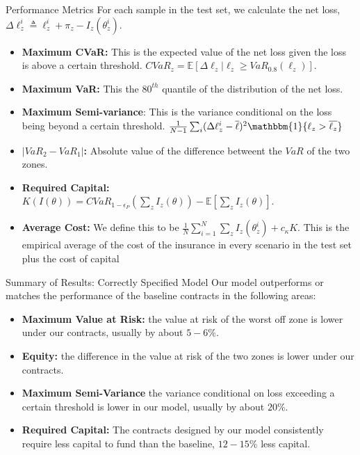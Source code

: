 \documentclass{beamer}
\begin{document}
\begin{frame}{Performance Metrics}
    For each sample in the test set, we calculate the net loss, $\Delta \ell_z^i \triangleq  \ell^i_z + \pi_z - I_z(\theta^i_z)$. 
    \begin{itemize}
        \item \textbf{Maximum CVaR:} This is the expected value of the net loss given the loss is above a certain threshold. $CVaR_z = \mathbb{E}\left [ \Delta \ell_z | \ell_z \geq VaR_{0.8} (\ell_z) \right ]$.
        \item \textbf{Maximum VaR:} This the $80^{th}$ quantile of the distribution of the net loss. 
        \item \textbf{Maximum Semi-variance}: This is the variance conditional on the loss being beyond a certain threshold. $\frac{1}{N-1}\sum_i (\Delta \ell_z^i - \overline{\ell})^2 \mathbbm{1} \{\ell_z > \overline{\ell_z}\}$ 
        \item \textbf{$|VaR_2 - VaR_1|$:} Absolute value of the difference betweent the $VaR$ of the two zones. 
        \item \textbf{Required Capital:} $K(I(\theta)) = CVaR_{1-\epsilon_P}(\sum_z I_z(\theta)) - \mathbb{E}[\sum_z I_z(\theta)]$. 
        \item \textbf{Average Cost:} We define this to be $\frac{1}{N}\sum_{i=1}^N \sum_z I_z(\theta^i_z) + c_{\kappa} K$. This is the empirical average of the cost of the insurance in every scenario in the test set plus the cost of capital
    \end{itemize}
\end{frame}

\begin{frame}{Summary of Results: Correctly Specified Model}
Our model outperforms or matches the performance of the baseline contracts in the following areas: 
\begin{itemize}
    \item \textbf{Maximum Value at Risk:} the value at risk of the worst off zone is lower under our contracts, usually by about $5-6\%$.
    \item \textbf{Equity:} the difference in the value at risk of the two zones is lower under our contracts.  
    
    \item \textbf{Maximum Semi-Variance} the variance conditional on loss exceeding a certain threshold is lower in our model, usually by about $20\%$.
    
    \item \textbf{Required Capital:} The contracts designed by our model consistently require less capital to fund than the baseline, $12-15\%$ less capital. 
\end{itemize}
\end{frame}
\end{document}

